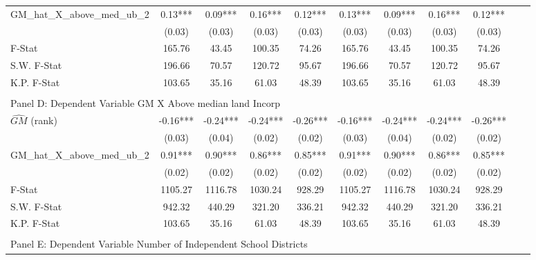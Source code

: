 \begin{table}[htbp]
\begin{threeparttable}
\begin{tabular}{l*{10}{c}}
\addlinespace
GM\_hat\_X\_above\_med\_ub\_2&       0.13***&       0.09***&       0.16***&       0.12***&       0.13***&       0.09***&       0.16***&       0.12***\\
                &     (0.03)   &     (0.03)   &     (0.03)   &     (0.03)   &     (0.03)   &     (0.03)   &     (0.03)   &     (0.03)   \\
\midrule
F-Stat          &     165.76   &      43.45   &     100.35   &      74.26   &     165.76   &      43.45   &     100.35   &      74.26   \\
S.W. F-Stat     &     196.66   &      70.57   &     120.72   &      95.67   &     196.66   &      70.57   &     120.72   &      95.67   \\
K.P. F-Stat     &     103.65   &      35.16   &      61.03   &      48.39   &     103.65   &      35.16   &      61.03   &      48.39   \\
\cmidrule[\heavyrulewidth](lr){1-9} \\ \cmidrule[\heavyrulewidth](lr){1-9}
\multicolumn{8}{l}{Panel D: Dependent Variable GM X Above median land Incorp}\\
\cmidrule(lr){1-9}
$\hat{GM}$ (rank)&      -0.16***&      -0.24***&      -0.24***&      -0.26***&      -0.16***&      -0.24***&      -0.24***&      -0.26***\\
                &     (0.03)   &     (0.04)   &     (0.02)   &     (0.02)   &     (0.03)   &     (0.04)   &     (0.02)   &     (0.02)   \\
\addlinespace
GM\_hat\_X\_above\_med\_ub\_2&       0.91***&       0.90***&       0.86***&       0.85***&       0.91***&       0.90***&       0.86***&       0.85***\\
                &     (0.02)   &     (0.02)   &     (0.02)   &     (0.02)   &     (0.02)   &     (0.02)   &     (0.02)   &     (0.02)   \\
\midrule
F-Stat          &    1105.27   &    1116.78   &    1030.24   &     928.29   &    1105.27   &    1116.78   &    1030.24   &     928.29   \\
S.W. F-Stat     &     942.32   &     440.29   &     321.20   &     336.21   &     942.32   &     440.29   &     321.20   &     336.21   \\
K.P. F-Stat     &     103.65   &      35.16   &      61.03   &      48.39   &     103.65   &      35.16   &      61.03   &      48.39   \\
\cmidrule[\heavyrulewidth](lr){1-9} \\ \cmidrule[\heavyrulewidth](lr){1-9}
\multicolumn{8}{l}{Panel E: Dependent Variable Number of Independent School Districts}\\

\end{tabular}
\end{threeparttable}
\end{table}
